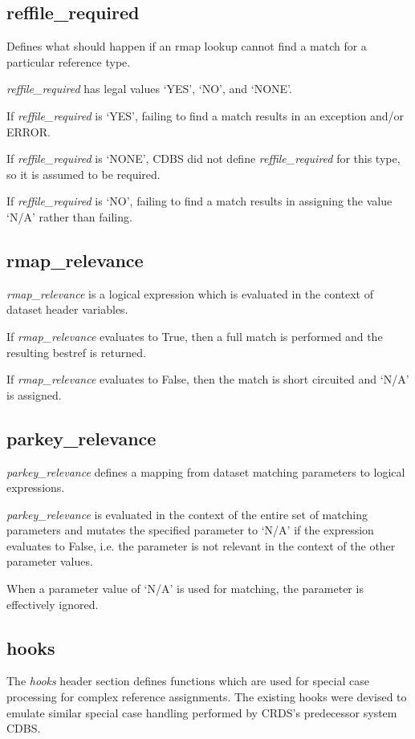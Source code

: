\documentclass[letterpaper,10pt,english]{sphinxmanual}
\begin{document}
\subsection{reffile\_required}
\label{rmap_syntax:reffile-required}
Defines what should happen if an rmap lookup cannot find a match for a particular reference type.

\emph{reffile\_required} has legal values `YES', `NO', and `NONE'.

If \emph{reffile\_required} is `YES', failing to find a match results in an exception and/or ERROR.

If \emph{reffile\_required} is `NONE', CDBS did not define \emph{reffile\_required} for this type, so it is assumed to be required.

If \emph{reffile\_required} is `NO',  failing to find a match results in assigning the value `N/A' rather than failing.


\subsection{rmap\_relevance}
\label{rmap_syntax:rmap-relevance}
\emph{rmap\_relevance} is a logical expression which is evaluated in the context of dataset header variables.

If \emph{rmap\_relevance} evaluates to True, then a full match is performed and the resulting bestref is returned.

If \emph{rmap\_relevance} evaluates to False, then the match is short circuited and `N/A' is assigned.


\subsection{parkey\_relevance}
\label{rmap_syntax:parkey-relevance}
\emph{parkey\_relevance} defines a mapping from dataset matching parameters to logical expressions.

\emph{parkey\_relevance} is evaluated in the context of the entire set of matching parameters and mutates
the specified parameter to `N/A' if the expression evaluates to False,  i.e. the parameter is not relevant
in the context of the other parameter values.

When a parameter value of `N/A' is used for matching, the parameter is effectively ignored.


\subsection{hooks}
\label{rmap_syntax:hooks}
The \emph{hooks} header section defines functions which are used for special case processing for complex reference
assignments.   The existing hooks were devised to emulate similar special case handling performed by CRDS's
predecessor system CDBS.
\end{document}
